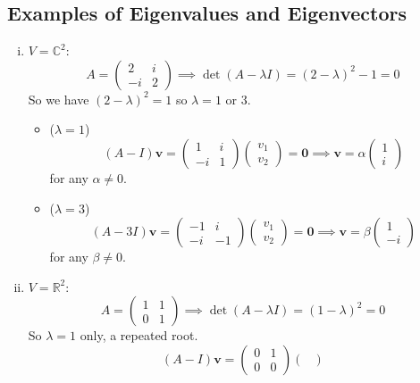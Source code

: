 \documentclass{article}
\begin{document}
	\subsection{Examples of Eigenvalues and Eigenvectors}
	\begin{enumerate}[(i)]
		\item $V = \mathbb C^2$:
		\[ A = \begin{pmatrix}
			2 & i \\ -i & 2
		\end{pmatrix} \implies \det(A - \lambda I) = (2-\lambda)^2 - 1 = 0 \]
		So we have $(2 - \lambda)^2 = 1$ so $\lambda = 1$ or 3.
		\begin{itemize}
			\item ($\lambda = 1$)
			\[ (A - I)\bm v = \begin{pmatrix}
				1 & i \\ -i & 1
			\end{pmatrix}\begin{pmatrix}
				v_1 \\ v_2
			\end{pmatrix} = \bm 0 \implies \bm v = \alpha\begin{pmatrix}
				1 \\ i
			\end{pmatrix} \]
			for any $\alpha \neq 0$.
			\item ($\lambda = 3$)
			\[ (A - 3I)\bm v = \begin{pmatrix}
				-1 & i \\ -i & -1
			\end{pmatrix}\begin{pmatrix}
				v_1 \\ v_2
			\end{pmatrix} = \bm 0 \implies \bm v = \beta\begin{pmatrix}
				1 \\ -i
			\end{pmatrix} \]
			for any $\beta \neq 0$.
		\end{itemize}
		\item $V = \mathbb R^2$:
		\[ A = \begin{pmatrix}
			1 & 1 \\ 0 & 1
		\end{pmatrix} \implies \det(A - \lambda I) = (1-\lambda)^2 = 0 \]
		So $\lambda = 1$ only, a repeated root.
		\[ (A - I)\bm v = \begin{pmatrix}
			0 & 1 \\ 0 & 0
		\end{pmatrix}\begin{pmatrix}

\end{pmatrix}\]
\end{enumerate}
\end{document}

